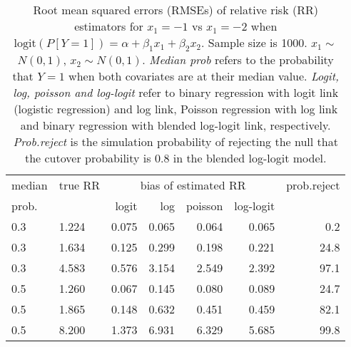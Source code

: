 \documentclass[12pt,a4paper]{article}
\begin{document}
\begin{table}[H] 
\small\sf\centering 
\caption{Root mean squared errors (RMSEs) of relative risk (RR) estimators for $x_1=-1$ vs $x_1=-2$ when $\mbox{logit}(P[Y=1])=\alpha+\beta_1 x_1 + \beta_2 x_2$. Sample size is 1000. $x_1 \sim $$N(0,1)$, $x_2 \sim N(0,1)$. {\it Median prob} refers to the probability that $Y=1$ when both covariates are at their median value. {\it Logit, log, poisson and log-logit} refer to binary regression with logit link (logistic regression) and log link, Poisson regression with log link and binary regression with blended log-logit link, respectively. {\it Prob.reject} is the simulation probability of rejecting the null that the cutover probability is $0.8$ in the blended log-logit model.} 
\begin{tabular}{llrrrrr} 
\toprule 
median & true RR & \multicolumn{4}{c}{bias of estimated RR} & prob.reject \\ 
prob. & & logit & log & poisson & log-logit  & \\ \midrule 
0.3 & 1.224 & 0.075 & 0.065 & 0.064 & 0.065 &  0.2 \\  
0.3 & 1.634 & 0.125 & 0.299 & 0.198 & 0.221 & 24.8 \\  
0.3 & 4.583 & 0.576 & 3.154 & 2.549 & 2.392 & 97.1 \\  
0.5 & 1.260 & 0.067 & 0.145 & 0.080 & 0.089 & 24.7 \\  
0.5 & 1.865 & 0.148 & 0.632 & 0.451 & 0.459 & 82.1 \\  
0.5 & 8.200 & 1.373 & 6.931 & 6.329 & 5.685 & 99.8 \\  
\bottomrule 
\end{tabular} 
\end{table} 
\end{document}

